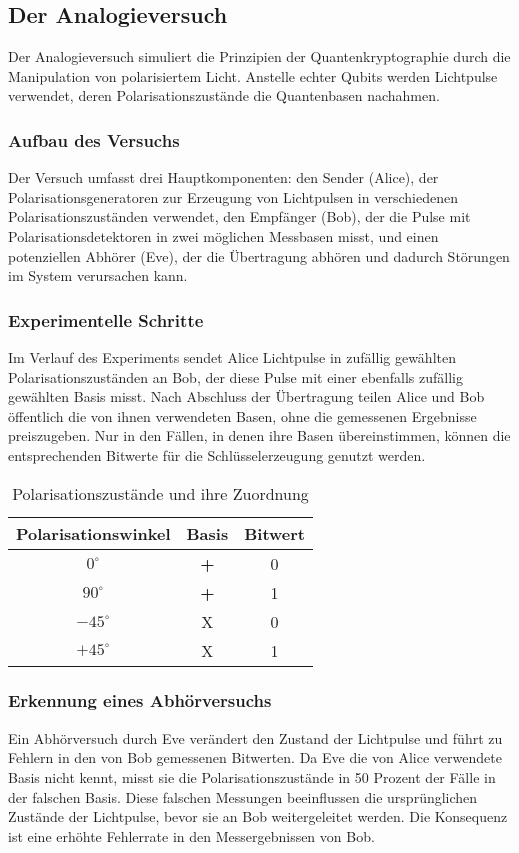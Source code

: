 \subsection{Der Analogieversuch}
Der Analogieversuch simuliert die Prinzipien der Quantenkryptographie durch die Manipulation von polarisiertem Licht. Anstelle echter Qubits werden Lichtpulse verwendet, deren Polarisationszustände die Quantenbasen nachahmen.

\subsubsection{Aufbau des Versuchs}
Der Versuch umfasst drei Hauptkomponenten: den Sender (Alice), der Polarisationsgeneratoren zur Erzeugung von Lichtpulsen in verschiedenen Polarisationszuständen verwendet, den Empfänger (Bob), der die Pulse mit Polarisationsdetektoren in zwei möglichen Messbasen misst, und einen potenziellen Abhörer (Eve), der die Übertragung abhören und dadurch Störungen im System verursachen kann.

\subsubsection{Experimentelle Schritte}
Im Verlauf des Experiments sendet Alice Lichtpulse in zufällig gewählten Polarisationszuständen an Bob, der diese Pulse mit einer ebenfalls zufällig gewählten Basis misst. Nach Abschluss der Übertragung teilen Alice und Bob öffentlich die von ihnen verwendeten Basen, ohne die gemessenen Ergebnisse preiszugeben. Nur in den Fällen, in denen ihre Basen übereinstimmen, können die entsprechenden Bitwerte für die Schlüsselerzeugung genutzt werden. 

\begin{table}[H]
\centering
\caption{Polarisationszustände und ihre Zuordnung}
\begin{tabular}{ccc}
\toprule
\textbf{Polarisationswinkel} & \textbf{Basis} & \textbf{Bitwert} \\
\midrule
\(0^\circ\) & \textbf{+} & 0 \\
\(90^\circ\) & \textbf{+} & 1 \\
\(-45^\circ\) & X & 0 \\
\(+45^\circ\) & X & 1 \\
\bottomrule
\end{tabular}
\end{table}

\subsubsection{Erkennung eines Abhörversuchs}
Ein Abhörversuch durch Eve verändert den Zustand der Lichtpulse und führt zu Fehlern in den von Bob gemessenen Bitwerten. Da Eve die von Alice verwendete Basis nicht kennt, misst sie die Polarisationszustände in 50 Prozent der Fälle in der falschen Basis. Diese falschen Messungen beeinflussen die ursprünglichen Zustände der Lichtpulse, bevor sie an Bob weitergeleitet werden. Die Konsequenz ist eine erhöhte Fehlerrate in den Messergebnissen von Bob.

